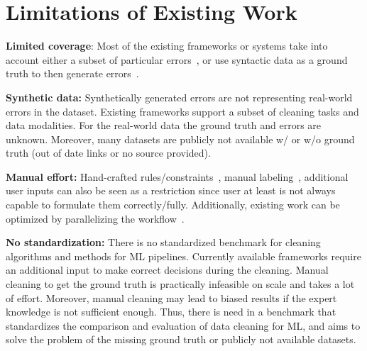 \newpage

\section{Limitations of Existing Work}
\label{sec:limitations_of_existing_work}

\textbf{Limited coverage}: Most of the existing frameworks or systems take into account either a subset of particular errors~\cite{boostclean, raha, baran, jenga}, or use syntactic data as a ground truth to then generate errors~\cite{RestatGCS2022, bart}.

\textbf{Synthetic data:} 
Synthetically generated errors are not representing real-world errors in the dataset. Existing frameworks support a subset of cleaning tasks and data modalities.
For the real-world data the ground truth and errors are unknown. Moreover, many datasets are publicly not available w/ or w/o ground truth (out of date links or no source provided).

\textbf{Manual effort:} 
Hand-crafted rules/constraints~\cite{bart, RestatGCS2022}, manual labeling~\cite{raha, baran}, additional user inputs can also be seen as a restriction 
since user at least is not always capable to formulate them correctly/fully. %
Additionally, existing work can be optimized by parallelizing the workflow~\cite{raha, baran, RekatsinasCIR2017, holodetect, RestatGCS2022, jenga}.

\textbf{No standardization:} 
There is no standardized benchmark for cleaning algorithms and methods for ML pipelines. 
Currently available frameworks require an additional input to make correct decisions during the cleaning. Manual cleaning to get the ground truth is practically infeasible on scale and takes a lot of effort.
Moreover, manual cleaning may lead to biased results if the expert knowledge is not sufficient enough.
Thus, there is need in a benchmark that standardizes the comparison and evaluation of data cleaning for ML, and aims to solve the problem of the missing ground truth or publicly not available datasets.
